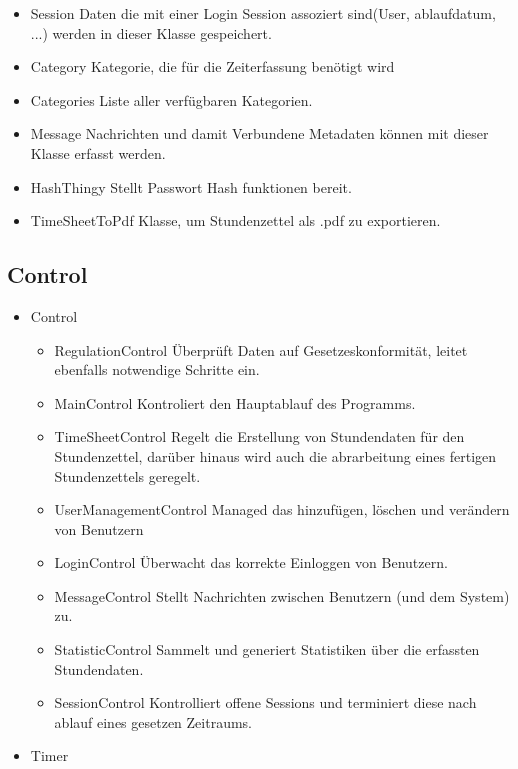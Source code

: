\begin{itemize}
            \item{Session}
                Daten die mit einer Login Session assoziert sind(User, ablaufdatum, ...) werden in dieser Klasse gespeichert.
            \item{Category}
                Kategorie, die für die Zeiterfassung benötigt wird
            \item{Categories}
                Liste aller verfügbaren Kategorien.
            \item{Message}
                Nachrichten und damit Verbundene Metadaten können mit dieser Klasse erfasst werden.
            \item{HashThingy}
                Stellt Passwort Hash funktionen bereit.
            \item{TimeSheetToPdf}
                Klasse, um Stundenzettel als .pdf zu exportieren.
        \end{itemize}
    \subsection{Control}
        \begin{itemize}
            \item{Control}
                \begin{itemize}
                    \item{RegulationControl}
                       Überprüft Daten auf Gesetzeskonformität, leitet ebenfalls notwendige Schritte ein.
                    \item{MainControl}
                        Kontroliert den Hauptablauf des Programms.
                    \item{TimeSheetControl}
                        Regelt die Erstellung von Stundendaten für den Stundenzettel, darüber hinaus wird auch die abrarbeitung eines fertigen Stundenzettels geregelt.
                    \item{UserManagementControl}
                        Managed das hinzufügen, löschen und verändern von Benutzern
                    \item{LoginControl}
                        Überwacht das korrekte Einloggen von Benutzern.
                    \item{MessageControl}
                        Stellt Nachrichten zwischen Benutzern (und dem System) zu.
                    \item{StatisticControl}
                        Sammelt und generiert Statistiken über die erfassten Stundendaten.
                    \item{SessionControl}
                        Kontrolliert offene Sessions und terminiert diese nach ablauf eines gesetzen Zeitraums.
                \end{itemize}
            \item{Timer}
        \end{itemize}

